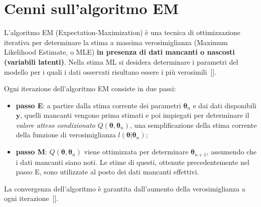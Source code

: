 \section[Cenni sull'algoritmo EM]{Cenni sull'algoritmo EM}
L'algoritmo EM (Expectation-Maximization) è una tecnica di ottimizzazione iterativa per determinare la stima a massima verosimiglianza (Maximum Likelihood Estimate, o MLE) \textbf{in presenza di dati mancanti o nascosti (variabili latenti)}. Nella stima ML si desidera determinare i parametri del modello per i quali i dati osservati risultano essere i più verosimili~[\cite{paper_EM_algorithm}]. \par Ogni iterazione dell'algoritmo EM consiste in due passi:
\begin{itemize}
	\item \textbf{passo E}: a partire dalla stima corrente dei parametri $\boldsymbol{\theta}_n$ e dai dati disponibili $\mathbf{y}$, quelli mancanti vengono prima stimati e poi impiegati per determinare il \textit{valore atteso condizionato} $Q(\boldsymbol{\theta},\boldsymbol{\theta}_n)$, una semplificazione della stima corrente della funzione di verosimiglianza $l(\boldsymbol{\theta}|\boldsymbol{\theta}_n)$;
	\item \textbf{passo M}: $Q(\boldsymbol{\theta},\boldsymbol{\theta}_n)$ viene ottimizzata per determinare $\boldsymbol{\theta}_{n+1}$, assumendo che i dati mancanti siano noti. Le stime di questi, ottenute precedentemente nel passo E, sono utilizzate al posto dei dati mancanti effettivi.
\end{itemize}
La convergenza dell'algoritmo è garantita dall'aumento della verosimiglianza a ogni iterazione~[\cite{paper_EM_algorithm}].


